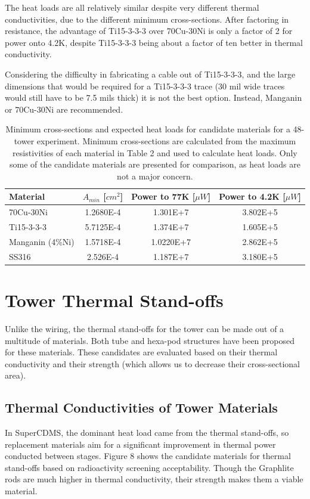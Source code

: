 \documentclass{report}
\begin{document}
The heat loads are all relatively similar despite very different thermal conductivities, due to the different minimum cross-sections. After factoring in resistance, the advantage of Ti15-3-3-3 over 70Cu-30Ni is only a factor of 2 for power onto 4.2K, despite Ti15-3-3-3 being about a factor of ten better in thermal conductivity.

Considering the difficulty in fabricating a cable out of Ti15-3-3-3, and the large dimensions that would be required for a Ti15-3-3-3 trace (30 mil wide traces would still have to be 7.5 mils thick) it is not the best option. Instead, Manganin or 70Cu-30Ni are recommended.

\begin{table}[h]
\centering
\begin{threeparttable}
\begin{tabular}{l|ccc}
\toprule
Material & $A_{min}$ [$cm^2$] & Power to 77K [$\mu W$] & Power to 4.2K [$\mu W$] \\
\midrule
70Cu-30Ni & 1.2680E-4 & 1.301E+7 & 3.802E+5 \\
Ti15-3-3-3 & 5.7125E-4 & 1.374E+7 & 1.605E+5 \\
Manganin (4\%Ni) & 1.5718E-4 & 1.0220E+7 & 2.862E+5 \\
SS316 & 2.526E-4 & 1.187E+7 & 3.180E+5 \\
\bottomrule
\end{tabular}
\end{threeparttable}
\caption{Minimum cross-sections and expected heat loads for candidate materials for a 48-tower experiment. Minimum cross-sections are calculated from the maximum resistivities of each material in Table 2 and used to calculate heat loads.  Only some of the candidate materials are presented for comparison, as heat loads are not a major concern.}
\end{table}


\section{Tower Thermal Stand-offs}
Unlike the wiring, the thermal stand-offs for the tower can be made out of a multitude of materials. Both tube and hexa-pod structures have been proposed for these materials. These candidates are evaluated based on their thermal conductivity and their strength (which allows us to decrease their cross-sectional area).

\subsection{Thermal Conductivities of Tower Materials}
In SuperCDMS, the dominant heat load came from the thermal stand-offs, so replacement materials aim for a significant improvement in thermal power conducted between stages. Figure 8 shows the candidate materials for thermal stand-offs based on radioactivity screening acceptability. Though the Graphlite rods are much higher in thermal conductivity, their strength makes them a viable material.
\end{document}

